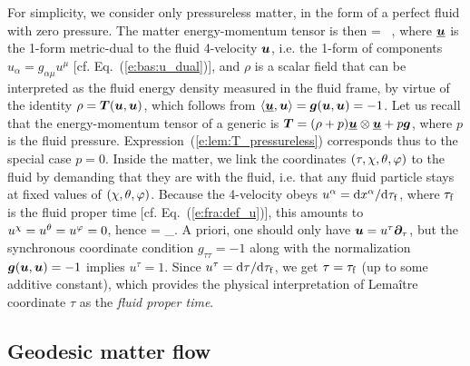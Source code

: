 For simplicity, we consider only pressureless matter, in the form of a perfect
fluid with zero pressure. The matter energy-momentum tensor is then
\be \label{e:lem:T_pressureless}
     = \rho \,  \otimes {} ,
\ee
where $\underline{\bm{u}}$ is the 1-form metric-dual to the fluid 4-velocity $\bm{u}$,
i.e. the 1-form of components $u_\alpha = g_{\alpha\mu} u^\mu$ [cf. Eq.~(\ref{e:bas:u_dual})],
and $\rho$ is a scalar field that can be interpreted as the fluid energy density
measured in the fluid frame, by virtue of the identity
$\rho = \bm{T}(\bm{u}, \bm{u})$, which follows from $\langle \underline{\bm{u}}, \bm{u} \rangle = \bm{g}(\bm{u},\bm{u}) = -1$.
Let us recall that the energy-momentum tensor of a generic
 is
$\bm{T} = (\rho + p)\underline{\bm{u}} \otimes \underline{\bm{u}} + p \bm{g}$, where $p$
is the fluid pressure. Expression~(\ref{e:lem:T_pressureless}) corresponds thus
to the special case $p=0$.
Inside the matter, we link the coordinates $(\tau,\chi,\theta,\varphi)$ to the fluid by demanding
that they are  with the fluid, i.e. that any fluid particle
stays at fixed values of $(\chi,\theta,\varphi)$.
Because the 4-velocity obeys $u^\alpha = \mathrm{d} x^\alpha/\mathrm{d} \tau_{\rm f}$, where
$\tau_{\rm f}$ is the fluid proper time [cf. Eq.~(\ref{e:fra:def_u})], this
amounts to $u^\chi=u^\theta = u^\varphi = 0$, hence
\be \label{e:lem:u_par_tau}
     = \wpar_\tau .
\ee
A priori, one should only have $\bm{u} =  u^\tau\bm{\partial}_\tau$, but the
synchronous coordinate condition $g_{\tau\tau} = -1$ along with the
normalization $\bm{g}(\bm{u},\bm{u})=-1$ implies $u^\tau=1$. Since $u^\tau = \mathrm{d}\tau / \mathrm{d}\tau_{\rm f}$, we get $\tau = \tau_{\rm f}$ (up to some additive constant), which provides the physical
interpretation of Lemaître coordinate $\tau$ as the \emph{fluid proper time}.

\subsection{Geodesic matter flow}

